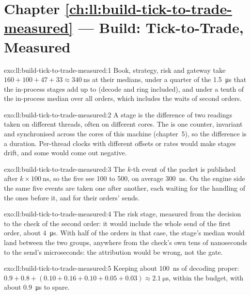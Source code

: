 \section*{Chapter \ref{ch:ll:build-tick-to-trade-measured} --- Build: Tick-to-Trade, Measured}

\begin{solution}{exo:ll:build-tick-to-trade-measured:1}
Book, strategy, risk and gateway take $160 + 100 + 47 + 33 \approx \qty{340}{\nano\second}$ at their medians, under a quarter of
the \qty{1.5}{\micro\second} that the in-process stages add up to (decode and ring included), and under a tenth of the in-process
median over all orders, which includes the waits of second orders.
\end{solution}

\begin{solution}{exo:ll:build-tick-to-trade-measured:2}
A stage is the difference of two readings taken on different threads, often on different cores. The  is one
counter, invariant and synchronised across the cores of this machine (chapter~5), so the difference is a duration. Per-thread
clocks with different offsets or rates would make stages drift, and some would come out negative.
\end{solution}

\begin{solution}{exo:ll:build-tick-to-trade-measured:3}
The $k$-th event of the packet is published after $k \times \qty{100}{\nano\second}$, so the five see 100 to 500, on average
\qty{300}{\nano\second}. On the engine side the same five events are taken one after another, each waiting for the handling of
the ones before it, and for their orders' sends.
\end{solution}

\begin{solution}{exo:ll:build-tick-to-trade-measured:4}
The risk stage, measured from the decision to the check of the second order: it would include the whole send of the first
order, about \qty{4}{\micro\second}. With half of the orders in that case, the stage's median would land between the two groups,
anywhere from the check's own tens of nanoseconds to the send's microseconds: the attribution would be wrong, not the gate.
\end{solution}

\begin{solution}{exo:ll:build-tick-to-trade-measured:5}
Keeping about \qty{100}{\nano\second} of decoding proper: $0.9 + 0.8 + (0.10 + 0.16 + 0.10 + 0.05 + 0.03) \approx
\qty{2.1}{\micro\second}$, within the budget, with about \qty{0.9}{\micro\second} to spare.
\end{solution}

